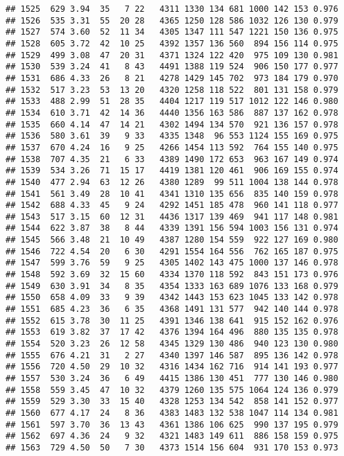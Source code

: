 \documentclass[]{article}
\begin{document}
\begin{verbatim}
## 1525  629 3.94  35   7 22   4311 1330 134 681 1000 142 153 0.976
## 1526  535 3.31  55  20 28   4365 1250 128 586 1032 126 130 0.979
## 1527  574 3.60  52  11 34   4305 1347 111 547 1221 150 136 0.975
## 1528  605 3.72  42  10 25   4392 1357 136 560  894 156 114 0.975
## 1529  499 3.08  47  20 31   4371 1324 122 420  975 109 130 0.981
## 1530  539 3.24  41   8 43   4491 1388 119 524  906 150 177 0.977
## 1531  686 4.33  26   8 21   4278 1429 145 702  973 184 179 0.970
## 1532  517 3.23  53  13 20   4320 1258 118 522  801 131 158 0.979
## 1533  488 2.99  51  28 35   4404 1217 119 517 1012 122 146 0.980
## 1534  610 3.71  42  14 36   4440 1356 163 586  887 137 162 0.978
## 1535  660 4.14  47  14 21   4302 1494 134 570  921 136 157 0.978
## 1536  580 3.61  39   9 33   4335 1348  96 553 1124 155 169 0.975
## 1537  670 4.24  16   9 25   4266 1454 113 592  764 155 140 0.975
## 1538  707 4.35  21   6 33   4389 1490 172 653  963 167 149 0.974
## 1539  534 3.26  71  15 17   4419 1381 120 461  906 169 155 0.974
## 1540  477 2.94  63  12 26   4380 1289  99 511 1004 138 144 0.978
## 1541  561 3.49  28  10 41   4341 1310 135 656  835 140 159 0.978
## 1542  688 4.33  45   9 24   4292 1451 185 478  960 141 118 0.977
## 1543  517 3.15  60  12 31   4436 1317 139 469  941 117 148 0.981
## 1544  622 3.87  38   8 44   4339 1391 156 594 1003 156 131 0.974
## 1545  566 3.48  21  10 49   4387 1280 154 559  922 127 169 0.980
## 1546  722 4.54  20   6 30   4291 1554 164 556  762 165 187 0.975
## 1547  599 3.76  59   9 25   4305 1402 143 475 1000 137 146 0.978
## 1548  592 3.69  32  15 60   4334 1370 118 592  843 151 173 0.976
## 1549  630 3.91  34   8 35   4354 1333 163 689 1076 133 168 0.979
## 1550  658 4.09  33   9 39   4342 1443 153 623 1045 133 142 0.978
## 1551  685 4.23  36   6 35   4368 1491 131 577  942 140 144 0.978
## 1552  615 3.78  30  11 25   4391 1346 138 641  915 152 162 0.976
## 1553  619 3.82  37  17 42   4376 1394 164 496  880 135 135 0.978
## 1554  520 3.23  26  12 58   4345 1329 130 486  940 123 130 0.980
## 1555  676 4.21  31   2 27   4340 1397 146 587  895 136 142 0.978
## 1556  720 4.50  29  10 32   4316 1434 162 716  914 141 193 0.977
## 1557  530 3.24  36   6 49   4415 1386 130 451  777 130 146 0.980
## 1558  559 3.45  47  10 32   4379 1260 135 575 1064 124 136 0.979
## 1559  529 3.30  33  15 40   4328 1253 134 542  858 141 152 0.977
## 1560  677 4.17  24   8 36   4383 1483 132 538 1047 114 134 0.981
## 1561  597 3.70  36  13 43   4361 1386 106 625  990 137 195 0.979
## 1562  697 4.36  24   9 32   4321 1483 149 611  886 158 159 0.975
## 1563  729 4.50  50   7 30   4373 1514 156 604  931 170 153 0.973

\end{verbatim}
\end{document}
